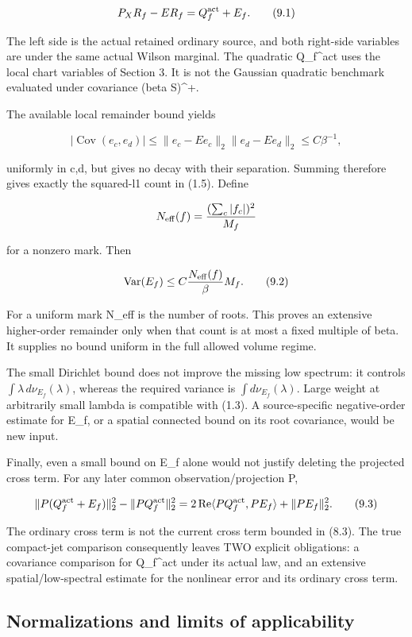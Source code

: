 \documentclass[
  11pt,
]{article}
\begin{document}
\[
 P_XR_f-ER_f=Q_f^{\rm act}+E_f.
\tag{9.1}
\]

The left side is the actual retained ordinary source, and both
right-side variables are under the same actual Wilson marginal. The
quadratic Q\_f\^{}act uses the local chart variables of Section 3. It is
not the Gaussian quadratic benchmark evaluated under covariance (beta
S)\^{}+.

The available local remainder bound yields

\[
 |\operatorname{Cov}(e_c,e_d)|
 \le\|e_c-Ee_c\|_2\|e_d-Ee_d\|_2
 \le C\beta^{-1},
\]

uniformly in c,d, but gives no decay with their separation. Summing
therefore gives exactly the squared-l1 count in (1.5). Define

\[
 N_{\rm eff}(f)=\frac{(\sum_c|f_c|)^2}{M_f}
\]

for a nonzero mark. Then

\[
 \operatorname{Var}(E_f)\le C\frac{N_{\rm eff}(f)}\beta M_f.
\tag{9.2}
\]

For a uniform mark N\_eff is the number of roots. This proves an
extensive higher-order remainder only when that count is at most a fixed
multiple of beta. It supplies no bound uniform in the full allowed
volume regime.

The small Dirichlet bound does not improve the missing low spectrum: it
controls \(\int\lambda\,d\nu_{E_f}(\lambda)\), whereas the required
variance is \(\int d\nu_{E_f}(\lambda)\). Large weight at arbitrarily
small lambda is compatible with (1.3). A source-specific negative-order
estimate for E\_f, or a spatial connected bound on its root covariance,
would be new input.

Finally, even a small bound on \textbar\textbar E\_f\textbar\textbar{}
alone would not justify deleting the projected cross term. For any later
common observation/projection P,

\[
 \|P(Q_f^{\rm act}+E_f)\|_2^2-\|PQ_f^{\rm act}\|_2^2
 =2\operatorname{Re}\langle PQ_f^{\rm act},PE_f\rangle
     +\|PE_f\|_2^2.
\tag{9.3}
\]

The ordinary cross term is not the current cross term bounded in (8.3).
The true compact-jet comparison consequently leaves TWO explicit
obligations: a covariance comparison for Q\_f\^{}act under its actual
law, and an extensive spatial/low-spectral estimate for the nonlinear
error and its ordinary cross term.

\hypertarget{normalizations-and-limits-of-applicability}{%
\subsection{Normalizations and limits of
applicability}\label{normalizations-and-limits-of-applicability}}
\end{document}
